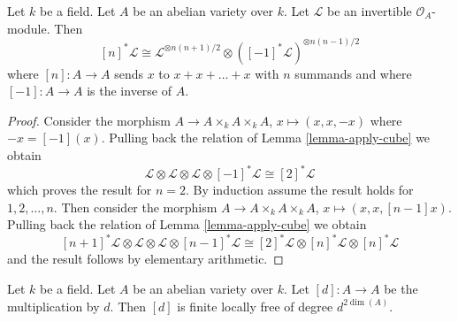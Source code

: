 \begin{lemma}
\label{lemma-pullbacks-by-n}
Let $k$ be a field. Let $A$ be an abelian variety over $k$.
Let $\mathcal{L}$ be an invertible $\mathcal{O}_A$-module.
Then
$$
[n]^*\mathcal{L} \cong
\mathcal{L}^{\otimes n(n + 1)/2} \otimes
([-1]^*\mathcal{L})^{\otimes n(n - 1)/2}
$$
where $[n] : A \to A$ sends $x$ to $x + x + \ldots + x$ with $n$ summands
and where $[-1] : A \to A$ is the inverse of $A$.
\end{lemma}

\begin{proof}
Consider the morphism $A \to A \times_k A \times_k A$,
$x \mapsto (x, x, -x)$ where $-x = [-1](x)$. Pulling back
the relation of Lemma \ref{lemma-apply-cube} we obtain
$$
\mathcal{L} \otimes
\mathcal{L} \otimes
\mathcal{L} \otimes
[-1]^*\mathcal{L} \cong
[2]^*\mathcal{L}
$$
which proves the result for $n = 2$. By induction assume the result holds
for $1, 2, \ldots, n$. Then consider the morphism
$A \to A \times_k A \times_k A$, $x \mapsto (x, x, [n - 1]x)$.
Pulling back
the relation of Lemma \ref{lemma-apply-cube} we obtain
$$
[n + 1]^*\mathcal{L} \otimes
\mathcal{L} \otimes
\mathcal{L} \otimes
[n - 1]^*\mathcal{L} \cong
[2]^*\mathcal{L} \otimes
[n]^*\mathcal{L} \otimes
[n]^*\mathcal{L}
$$
and the result follows by elementary arithmetic.
\end{proof}

\begin{lemma}
\label{lemma-degree-multiplication-by-d}
Let $k$ be a field. Let $A$ be an abelian variety over $k$.
Let $[d] : A \to A$ be the multiplication by $d$.
Then $[d]$ is finite locally free of degree $d^{2\dim(A)}$.
\end{lemma}

